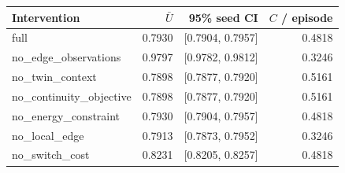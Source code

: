\begin{tabular}{lrrr}
\toprule
Intervention & $\bar U$ & 95\% seed CI & $C$ / episode \\
\midrule
full & 0.7930 & [0.7904, 0.7957] & 0.4818 \\
no\_edge\_observations & 0.9797 & [0.9782, 0.9812] & 0.3246 \\
no\_twin\_context & 0.7898 & [0.7877, 0.7920] & 0.5161 \\
no\_continuity\_objective & 0.7898 & [0.7877, 0.7920] & 0.5161 \\
no\_energy\_constraint & 0.7930 & [0.7904, 0.7957] & 0.4818 \\
no\_local\_edge & 0.7913 & [0.7873, 0.7952] & 0.3246 \\
no\_switch\_cost & 0.8231 & [0.8205, 0.8257] & 0.4818 \\
\bottomrule
\end{tabular}
